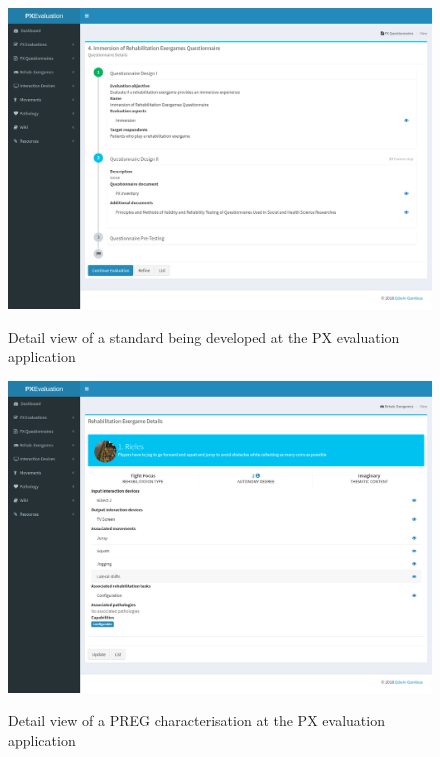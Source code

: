 \begin{figure}[bth]
\myfloatalign
{\includegraphics[width=\linewidth]{gfx/app/standardApp}} \quad
\caption{Detail view of a standard being developed at the \ac{PX} evaluation application}\label{fig:standardApp}
\end{figure}

\begin{figure}[bth]
\myfloatalign
{\includegraphics[width=\linewidth]{gfx/app/characterisingApp}} \quad
\caption{Detail view of a \ac{PREG} characterisation at the \ac{PX} evaluation application}\label{fig:characterisingApp}
\end{figure}

\clearpage
